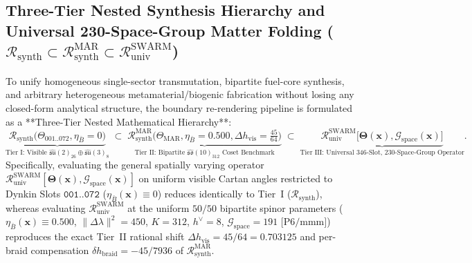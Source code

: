\documentclass[11pt,onecolumn]{article}
\begin{document}
\FloatBarrier
\FloatBarrier
\subsection[Three-Tier Nested Synthesis Hierarchy and Universal Matter Folding]{Three-Tier Nested Synthesis Hierarchy and Universal 230-Space-Group Matter Folding (\texorpdfstring{$\mathcal{R}_{\text{synth}} \subset \mathcal{R}_{\text{synth}}^{\text{MAR}} \subset \mathcal{R}_{\text{univ}}^{\text{SWARM}}$}{R(synth) c R(MAR) c R(univ)})}
\label{subsec:universal_folding}
To unify homogeneous single-sector transmutation, bipartite fuel-core synthesis, and arbitrary heterogeneous metamaterial/biogenic fabrication without losing any closed-form analytical structure, the boundary re-rendering pipeline is formulated as a **Three-Tier Nested Mathematical Hierarchy**:
\begin{equation}
\underbrace{\mathcal{R}_{\text{synth}}\big(\Theta_{001..072}, \eta_{\bar{B}}=0\big)}_{\text{Tier I: Visible }\widehat{\mathfrak{su}}(2)_{26}\oplus\widehat{\mathfrak{su}}(3)_8}
\;\subset\;
\underbrace{\mathcal{R}_{\text{synth}}^{\text{MAR}}\big(\Theta_{\text{MAR}}, \eta_{\bar{B}}=0.500, \Delta h_{\text{vis}}=\tfrac{45}{64}\big)}_{\text{Tier II: Bipartite }\widehat{\mathfrak{so}}(10)_{312}\text{ Coset Benchmark}}
\;\subset\;
\underbrace{\mathcal{R}_{\text{univ}}^{\text{SWARM}}\big[\bm{\Theta}(\mathbf{x}), \mathcal{G}_{\text{space}}(\mathbf{x})\big]}_{\text{Tier III: Universal 346-Slot, 230-Space-Group Operator}}.
\label{eq:three_tier_hierarchy}
\end{equation}
Specifically, evaluating the general spatially varying operator $\mathcal{R}_{\text{univ}}^{\text{SWARM}}[\bm{\Theta}(\mathbf{x}), \mathcal{G}_{\text{space}}(\mathbf{x})]$ on uniform visible Cartan angles restricted to Dynkin Slots $\texttt{001..072}$ ($\eta_{\bar{B}}(\mathbf{x}) \equiv 0$) reduces identically to Tier~I ($\mathcal{R}_{\text{synth}}$), whereas evaluating $\mathcal{R}_{\text{univ}}^{\text{SWARM}}$ at the uniform $50/50$ bipartite spinor parameters ($\eta_{\bar{B}}(\mathbf{x}) \equiv 0.500$, $\|\Delta\lambda\|^2 = 450$, $K = 312$, $h^\vee = 8$, $\mathcal{G}_{\text{space}} = 191\text{ [P6/mmm]}$) reproduces the exact Tier~II rational shift $\Delta h_{\text{vis}} = 45/64 = 0.703125$ and per-braid compensation $\delta h_{\text{braid}} = -45/7936$ of $\mathcal{R}_{\text{synth}}^{\text{MAR}}$.
\end{document}
